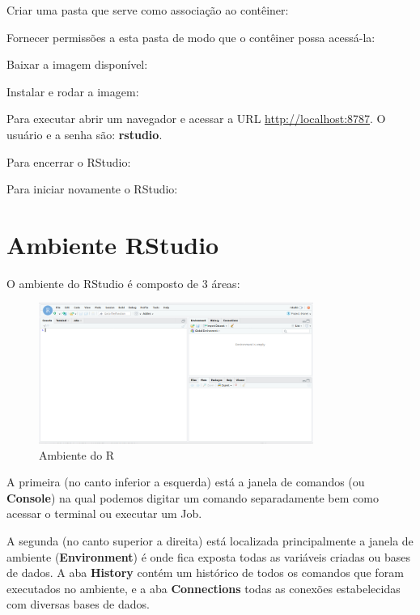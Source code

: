 \documentclass[a4paper,11pt]{article}
\begin{document}
Criar uma pasta que serve como associação ao contêiner: \\

Fornecer permissões a esta pasta de modo que o contêiner possa acessá-la: \\

Baixar a imagem disponível: \\

Instalar e rodar a imagem: \\

Para executar abrir um navegador e acessar a URL \url{http://localhost:8787}. O usuário e a senha são: \textbf{rstudio}.

Para encerrar o RStudio: \\

Para iniciar novamente o RStudio: \\

\section{Ambiente RStudio}
O ambiente do RStudio é composto de 3 áreas:
\begin{figure}[H]
	\centering
	\includegraphics[width=0.8\textwidth]{imagens/RStudio.png}
	\caption{Ambiente do R}
\end{figure}

A primeira (no canto inferior a esquerda) está a janela de comandos (ou \textbf{Console}) na qual podemos digitar um comando separadamente bem como acessar o terminal ou executar um Job.

A segunda (no canto superior a direita) está localizada principalmente a janela de ambiente (\textbf{Environment}) é onde fica exposta todas as variáveis criadas ou bases de dados. A aba \textbf{History} contém um histórico de todos os comandos que foram executados no ambiente, e a aba \textbf{Connections} todas as conexões estabelecidas com diversas bases de dados.
\end{document}
